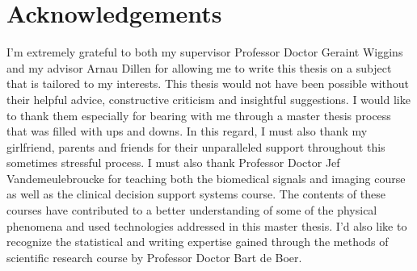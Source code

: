 \chapter*{Acknowledgements}
\label{ch:acknowledgements}


I'm extremely grateful to both my supervisor Professor Doctor Geraint Wiggins and my advisor Arnau Dillen for allowing me to write this thesis on a subject that is tailored to my interests.
This thesis would not have been possible without their helpful advice, constructive criticism and insightful suggestions.
I would like to thank them especially for bearing with me through a master thesis process that was filled with ups and downs.
In this regard, I must also thank my girlfriend, parents and friends for their unparalleled support throughout this sometimes stressful process.
I must also thank Professor Doctor Jef Vandemeulebroucke for teaching both the biomedical signals and imaging course as well as the clinical decision support systems course.
The contents of these courses have contributed to a better understanding of some of the physical phenomena and used technologies addressed in this master thesis.
I'd also like to recognize the statistical and writing expertise gained through the methods of scientific research course by Professor Doctor Bart de Boer.

